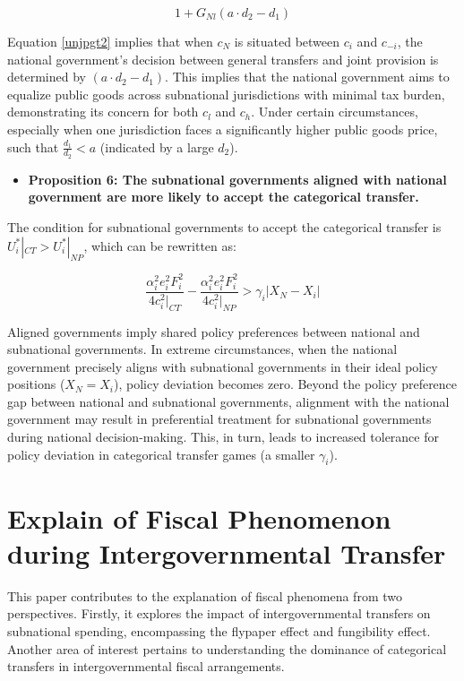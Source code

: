 \begin{equation}
    1+G_{Nl}(a \cdot d_2-d_1) \label{unjpgt3}
\end{equation}


Equation \ref{unjpgt2} implies that when $c_N$ is situated between $c_i$ and $c_{-i}$, the national government's decision between general transfers and joint provision is determined by $(a \cdot d_2 - d_1)$. This implies that the national government aims to equalize public goods across subnational jurisdictions with minimal tax burden, demonstrating its concern for both $c_l$ and $c_h$. Under certain circumstances, especially when one jurisdiction faces a significantly higher public goods price, such that $\frac{d_1}{d_2}<a$ (indicated by a large $d_2$).%

\begin {itemize}
\item \textbf{Proposition 6: The subnational governments aligned with national government are more likely to accept the categorical transfer.}
\end{itemize}

The condition for subnational governments to accept the categorical transfer is $U^*_i|_{CT}>U^*_i|_{NP}$, which can be rewritten as:

\begin{equation}
    \frac{\alpha_i^2 e_i^2 F_i^2}{4c_i^2|_{CT}}-\frac{\alpha_i^2 e_i^2 F_i^2}{4c_i^2|_{NP}}> \gamma_i|X_N-X_i|
\end{equation}

Aligned governments imply shared policy preferences between national and subnational governments. In extreme circumstances, when the national government precisely aligns with subnational governments in their ideal policy positions ($X_N = X_i$), policy deviation becomes zero. Beyond the policy preference gap between national and subnational governments, alignment with the national government may result in preferential treatment for subnational governments during national decision-making. This, in turn, leads to increased tolerance for policy deviation in categorical transfer games (a smaller $\gamma_i$). %


\section{Explain of Fiscal Phenomenon during Intergovernmental Transfer}

This paper contributes to the explanation of fiscal phenomena from two perspectives. Firstly, it explores the impact of intergovernmental transfers on subnational spending, encompassing the flypaper effect and fungibility effect. Another area of interest pertains to understanding the dominance of categorical transfers in intergovernmental fiscal arrangements.%

